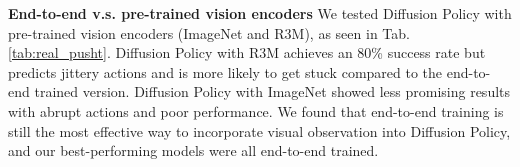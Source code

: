 \textbf{End-to-end v.s. pre-trained vision encoders}
We tested Diffusion Policy with pre-trained vision encoders (ImageNet \cite{deng2009imagenet} and R3M\cite{nair2022r3m}), as seen in Tab. \ref{tab:real_pusht}. Diffusion Policy with R3M achieves an 80\% success rate but predicts jittery actions and is more likely to get stuck compared to the end-to-end trained version. Diffusion Policy with ImageNet showed less promising results with abrupt actions and poor performance. We found that end-to-end training is still the most effective way to incorporate visual observation into Diffusion Policy, and our best-performing models were all end-to-end trained.



